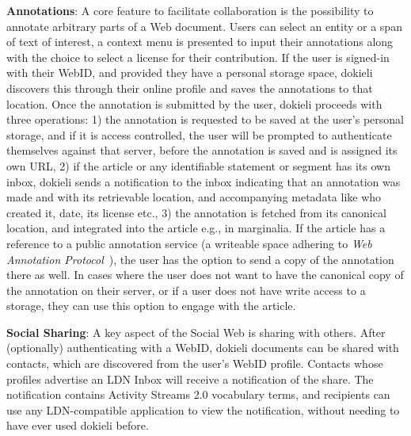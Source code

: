 \documentclass[a4paper]{llncs}
\begin{document}
                                    
\par \textbf{Annotations}: A core feature to facilitate collaboration is the possibility to annotate arbitrary parts of a Web document.
                                    Users can select an entity or a span of text of interest, a context menu is presented to input their annotations along with the choice to select a license for their contribution.
                                    If the user is signed-in with their WebID, and provided they have a personal storage space, dokieli discovers this through their online profile and saves the annotations to that location.
                                    Once the annotation is submitted by the user, dokieli proceeds with three operations: 1) the annotation is requested to be saved at the user’s personal storage, and if it is access controlled, the user will be prompted to authenticate themselves against that server, before the annotation is saved and is assigned its own URL, 2) if the article or any identifiable statement or segment has its own inbox, dokieli sends a notification to the inbox indicating that an annotation was made and with its retrievable location, and accompanying metadata like who created it, date, its license etc., 3) the annotation is fetched from its canonical location, and integrated into the article e.g., in marginalia. If the article has a reference to a public annotation service (a writeable space adhering to \textit{Web Annotation Protocol}~\cite{ref-15}), the user has the option to send a copy of the annotation there as well. In cases where the user does not want to have the canonical copy of the annotation on their server, or if a user does not have write access to a storage, they can use this option to engage with the article.
                                    

                                    
\par \textbf{Social Sharing}: A key aspect of the Social Web is sharing with others.
                                    After (optionally) authenticating with a WebID, dokieli documents can be shared with contacts, which are discovered from the user’s WebID profile. Contacts whose profiles advertise an LDN Inbox will receive a notification of the share. The notification contains Activity Streams 2.0 vocabulary terms, and recipients can use any LDN-compatible application to view the notification, without needing to have ever used dokieli before.
\end{document}

